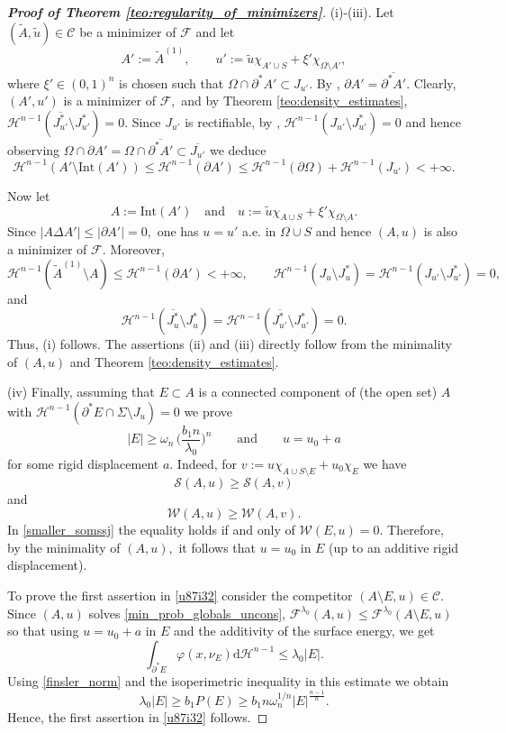 \documentclass[reqno]{amsart}
\numberwithin{equation}{section}
\theoremstyle{plain}
\theoremstyle{definition}
\newcommand{\cH}{\mathcal{H}}
\newcommand{\cS}{\mathcal{S}}
\newcommand{\cF}{\mathcal{F}}
\newcommand{\cW}{\mathcal{W}}
\newcommand{\p}{\partial}
\newcommand{\cl}[1]{\overline{#1}}
\newcommand{\bound}{b}
\renewcommand{\d}{\mathrm{d}}
\renewcommand{\tilde}{\widetilde}
\newcommand{\Int}[1]{\mathrm{Int}(#1)}
\newcommand{\admissible}{\mathcal{C}}
\newcommand{\substrate}{S}
\begin{document}
\begin{proof}[\textbf{Proof of Theorem \ref{teo:regularity_of_minimizers}}]
%
(i)-(iii). Let $(\tilde A,\tilde u)\in\admissible$ be a minimizer of $\cF$ and let 
$$
A':=\tilde A^{(1)},\qquad u':=\tilde u\chi_{A'\cup S} + \xi'\chi_{\Omega\setminus A'},
$$
where $\xi'\in(0,1)^n$ is chosen such that $\Omega\cap \p^*A'\subset J_{u'}.$ By \cite[Chapter 15]{Maggi:2012},  $\p A' = \cl{\p^*A'}.$ Clearly, $(A',u')$ is a minimizer of $\cF,$ and by Theorem \ref{teo:density_estimates}, $\cH^{n-1}(\cl{J_{u'}^*}\setminus J_{u'}^*)=0.$ Since $J_{u'}$ is rectifiable,
by \cite[Theorem 2.63]{AFP:2000}, $\cH^{n-1}(J_{u'}\setminus J_{u'}^*)=0$  and hence observing $\Omega\cap \p A' = \Omega\cap \cl{\p^*A'} \subset \cl{J_{u'}}$ we deduce
$$
\cH^{n-1}(A'\setminus \Int{A'}) \le \cH^{n-1}(\p A') \le \cH^{n-1}(\p\Omega) + \cH^{n-1}(J_{u'}) <+\infty.
$$

Now let 
$$
A:=\Int{A'}\quad\text{and}\quad u:=\tilde u\chi_{A\cup S} + \xi'\chi_{\Omega\setminus A}.
$$
Since $|A\Delta A'| \le |\p A'| = 0,$ one has $u = u'$ a.e. in $\Omega\cup S$ and hence  $(A,u)$ is also a minimizer of $\cF.$ Moreover,
$$
\cH^{n-1}(\tilde A^{(1)} \setminus A) \le \cH^{n-1}(\p A') < +\infty,\qquad \cH^{n-1}(J_u\setminus J_{u}^*) = \cH^{n-1}(J_{u'}\setminus J_{u'}^*) =0,
$$
and 
$$
\cH^{n-1}(\cl{J_u^*}\setminus J_{u}^*) = \cH^{n-1}(\cl{J_{u'}^*}\setminus J_{u'}^*) =0.
$$
Thus, (i) follows. The assertions (ii) and (iii) directly follow from the minimality of $(A,u)$ and Theorem \ref{teo:density_estimates}.


(iv)  Finally, assuming that $E\subset A$ is a connected component of (the open set) $A$ with $\cH^{n-1}(\p^* E\cap \Sigma\setminus J_u)=0$ we prove
\begin{equation} \label{u87i32}
|E|\ge \omega_n \,\Big(\frac{\bound_1n}{\lambda_0}\Big)^n\qquad \text{and} \qquad
u = u_0 +a
\end{equation}
for some rigid displacement $a.$
Indeed, for $v:=u\chi_{A\cup\substrate\setminus E} + u_0\chi_E$  we have
$$
\cS(A,u) \ge \cS(A,v)
$$
and 
\begin{equation}\label{smaller_somssj}
\cW(A,u) \ge \cW(A,v).
\end{equation}
%
In \eqref{smaller_somssj} the equality holds if and only of $\cW(E,u)=0.$   Therefore, by the minimality of $(A,u),$ it follows that $u=u_0$ in $E$ (up to an additive rigid displacement).

To prove the first assertion in \eqref{u87i32} consider the competitor $(A\setminus E,u)\in\admissible.$ Since $(A,u)$ solves \eqref{min_prob_globals_uncons},
$\cF^{\lambda_0}(A,u) \le \cF^{\lambda_0}(A\setminus E,u)$ so that using $u=u_0+a$ in $E$ and the additivity of the surface energy, we get
$$
\int_{\p^*E} \varphi(x,\nu_E)\d\cH^{n-1} \le \lambda_0 |E|.
$$
Using \eqref{finsler_norm} and the isoperimetric inequality in this estimate we obtain
$$
\lambda_0 |E| \ge \bound_1 P(E) \ge \bound_1 n\omega_n^{1/n} |E|^{\frac{n-1}{n}}.
$$
Hence, the first assertion in \eqref{u87i32} follows.
\end{proof}
 
\end{document}
